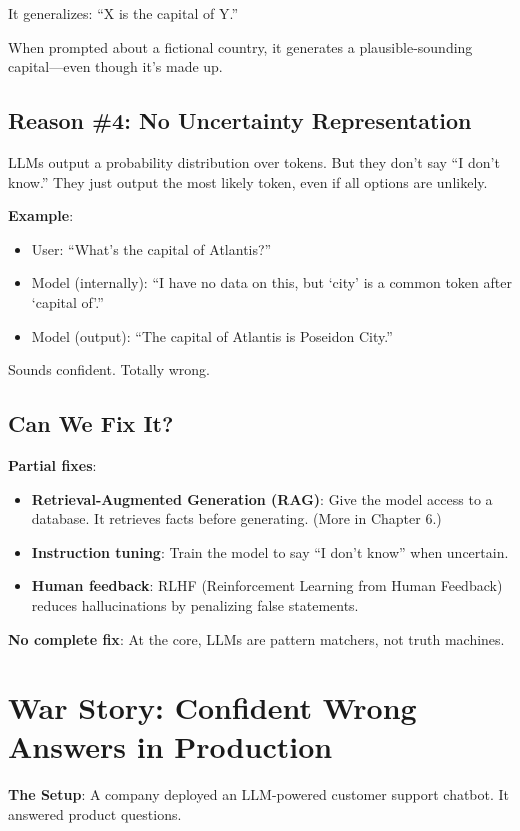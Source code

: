 \documentclass[11pt,oneside]{book}
\begin{document}
It generalizes: ``X is the capital of Y.''

When prompted about a fictional country, it generates a plausible-sounding capital---even though it's made up.

\subsection{Reason \#4: No Uncertainty Representation}

LLMs output a probability distribution over tokens. But they don't say ``I don't know.'' They just output the most likely token, even if all options are unlikely.

\textbf{Example}:
\begin{itemize}
\item User: ``What's the capital of Atlantis?''
\item Model (internally): ``I have no data on this, but `city' is a common token after `capital of'.''
\item Model (output): ``The capital of Atlantis is Poseidon City.''
\end{itemize}

Sounds confident. Totally wrong.

\subsection{Can We Fix It?}

\textbf{Partial fixes}:
\begin{itemize}
\item \textbf{Retrieval-Augmented Generation (RAG)}: Give the model access to a database. It retrieves facts before generating. (More in Chapter 6.)
\item \textbf{Instruction tuning}: Train the model to say ``I don't know'' when uncertain.
\item \textbf{Human feedback}: RLHF (Reinforcement Learning from Human Feedback) reduces hallucinations by penalizing false statements.
\end{itemize}

\textbf{No complete fix}: At the core, LLMs are pattern matchers, not truth machines.

\section{War Story: Confident Wrong Answers in Production}

\textbf{The Setup}: A company deployed an LLM-powered customer support chatbot. It answered product questions.
\end{document}
